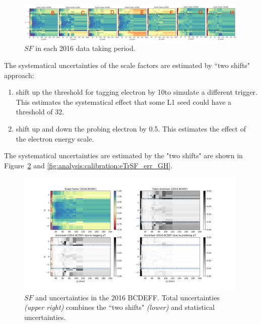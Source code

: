 \begin{figure}
    \centering
    \includegraphics[width=0.99\textwidth]{chapters/Analysis/sectionCalibration/figures/eTrigger/result_period.png}
    \caption{$SF$ in each 2016 data taking period.}
    \label{fig:analysis:calibration:ele27SFperiods}
\end{figure}
The systematical uncertainties of the scale factors are estimated by ``two shifts" approach:
\begin{enumerate}
  \item shift up the \pt threshold for tagging electron by 10\GeV to simulate a different trigger. This estimates the systematical effect that some L1 seed could have a threshold of 32\GeV.
  \item shift up and down the probing electron \pt by 0.5\GeV. This estimates the effect of the electron energy scale.
\end{enumerate}
\noindent The systematical uncertainties are estimated by the "two shifts" are shown in Figure~\ref{fig:analysis:calibration:eTrSF_err_BCDEF} and \ref{fig:analysis:calibration:eTrSF_err_GH}.

\begin{figure}
    \centering
    \includegraphics[width=0.99\textwidth]{chapters/Analysis/sectionCalibration/figures/eTrigger/result_BCDEF.png}
    \caption{$SF$ and uncertainties in the 2016 BCDEFF. Total uncertainties \emph{(upper right)} combines the ``two shifts" \emph{(lower)} and statistical uncertainties.}
    \label{fig:analysis:calibration:eTrSF_err_BCDEF}
\end{figure}

